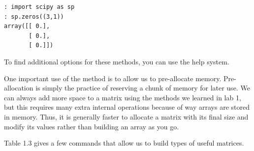 \begin{lstlisting}
: import scipy as sp
: sp.zeros((3,1))
array([[ 0.],
       [ 0.],
       [ 0.]])
\end{lstlisting}

To find additional options for these methods, you can use the help system.


One important use of the  method is to allow us to pre-allocate memory. Pre-allocation is simply the practice of reserving a chunk of memory for later use. We can always add more space to a matrix using the methods we learned in lab 1, but this requires many extra internal operations because of way arrays are stored in memory. Thus, it is generally faster to allocate a matrix with its final size and modify its values rather than building an array as you go.



Table 1.3 gives a few commands that allow us to build types of useful matrices.

